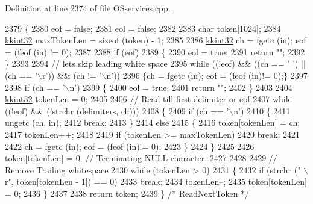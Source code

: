 Definition at line 2374 of file O\+Sservices.\+cpp.


\begin{DoxyCode}
2379 \{
2380   eof = \textcolor{keyword}{false};
2381   eol = \textcolor{keyword}{false};
2382 
2383   \textcolor{keywordtype}{char}  token[1024];
2384   \hyperlink{namespace_k_k_b_a8fa4952cc84fda1de4bec1fbdd8d5b1b}{kkint32}  maxTokenLen = \textcolor{keyword}{sizeof} (token) - 1;
2385 
2386   \hyperlink{namespace_k_k_b_a8fa4952cc84fda1de4bec1fbdd8d5b1b}{kkint32}  ch = fgetc (in);  eof = (feof (in) != 0);
2387 
2388   \textcolor{keywordflow}{if}  (eof)
2389   \{
2390     eol = \textcolor{keyword}{true};
2391     \textcolor{keywordflow}{return} \textcolor{stringliteral}{""};
2392   \}
2393 
2394   \textcolor{comment}{// lets skip leading white space}
2395   \textcolor{keywordflow}{while}  ((!eof)  &&  ((ch == \textcolor{charliteral}{' '}) || (ch == \textcolor{charliteral}{'\(\backslash\)r'}))  &&  (ch != \textcolor{charliteral}{'\(\backslash\)n'}))
2396     \{ch = fgetc (in); eof = (feof (in)!= 0);\}
2397 
2398   \textcolor{keywordflow}{if}  (ch == \textcolor{charliteral}{'\(\backslash\)n'})
2399   \{
2400     eol = \textcolor{keyword}{true};
2401     \textcolor{keywordflow}{return} \textcolor{stringliteral}{""};
2402   \}
2403 
2404   \hyperlink{namespace_k_k_b_a8fa4952cc84fda1de4bec1fbdd8d5b1b}{kkint32} tokenLen = 0;
2405 
2406   \textcolor{comment}{// Read till first delimiter or eof}
2407   \textcolor{keywordflow}{while}  ((!eof)  &&  (!strchr (delimiters, ch)))
2408   \{
2409     \textcolor{keywordflow}{if}  (ch == \textcolor{charliteral}{'\(\backslash\)n'})
2410     \{
2411       ungetc (ch, in);
2412       \textcolor{keywordflow}{break};
2413     \}
2414     \textcolor{keywordflow}{else}
2415     \{
2416       token[tokenLen] = ch;
2417       tokenLen++;
2418       
2419       \textcolor{keywordflow}{if}  (tokenLen >= maxTokenLen)
2420         \textcolor{keywordflow}{break};
2421 
2422       ch = fgetc (in); eof = (feof (in)!= 0);
2423     \}
2424   \}
2425 
2426   token[tokenLen] = 0;  \textcolor{comment}{// Terminating NULL character.}
2427 
2428 
2429   \textcolor{comment}{// Remove Trailing whitespace}
2430   \textcolor{keywordflow}{while}  (tokenLen > 0)
2431   \{
2432     \textcolor{keywordflow}{if}  (strchr (\textcolor{stringliteral}{" \(\backslash\)r"}, token[tokenLen - 1]) == 0)
2433       \textcolor{keywordflow}{break};
2434     tokenLen--;
2435     token[tokenLen] = 0;
2436   \}
2437 
2438   \textcolor{keywordflow}{return}  token;
2439 \}  \textcolor{comment}{/* ReadNextToken */}
\end{DoxyCode}
